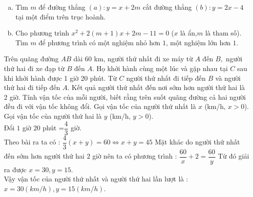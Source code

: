 	\begin{ex}%
		\hspace{.01mm}
		\begin{enumerate}[a)]
		\item Tìm $m$ để đường thẳng $(a):y=x+2m $ cắt đường thẳng $(b):y=2x-4 $ tại một điểm trên trục hoành.
		\item Cho phương trình $ x^2+2(m+1)x+2m-11=0 $ ($ x $ là ẩn,$ m $ là tham số).
	Tìm $m$ để phương trình có một nghiệm nhỏ hơn $1$, một nghiệm lớn hơn $1$.
		\end{enumerate}
	\end{ex}
	\begin{ex} %
	Trên quãng đường $ AB $ dài 60 km, người thứ nhất đi xe máy từ $ A $ đến $ B,$ người thứ hai đi xe đạp từ $ B $ đến $ A $. Họ khởi hành cùng một lúc và gặp nhau tại $ C $ sau khi khởi hành được 1 giờ 20 phút. Từ $ C $ người thứ nhất đi tiếp đến $ B $ và người thứ hai đi tiếp đến $ A $. Kết quả người thứ nhất đến nơi sớm hơn người thứ hai là 2 giờ. Tính vận tốc của mỗi người, biết rằng trên suốt quãng đường cả hai người đều đi với vận tốc không đổi.
	\loigiai
	{
Gọi vận tốc của người thứ nhất là $x$ (km/h, $x>0$).\\
Gọi vận tốc của người thứ hai là $y$ (km/h, $y>0$).\\
 Đổi $1$ giờ $20$ phút =$\dfrac{4}{3}$ giờ.\\
 Theo bài ra ta có :  $\dfrac{4}{3}(x+y)=60 \Leftrightarrow x+y=45$ 
 Mặt khác do người thứ nhất đến sớm hơn người thứ hai $2$ giờ nên ta có phương trình : $\dfrac{60}{x}+2=\dfrac{60}{y}$ 
 Từ đó giải ra được $x=30, y=15$.\\
 Vậy vận tốc của người thứ nhất và người thứ hai lần lượt là : $x=30(km/h), y=15(km/h)$.\ 
}
	\end{ex}
